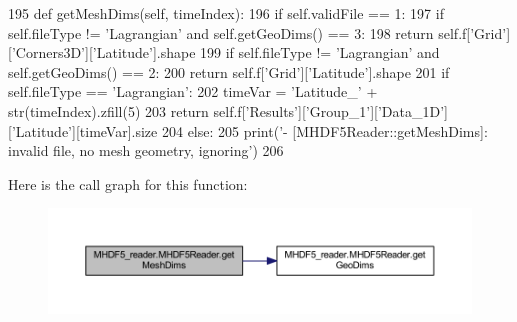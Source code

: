 \begin{DoxyCode}
195     \textcolor{keyword}{def }getMeshDims(self, timeIndex):
196         \textcolor{keywordflow}{if} self.validFile == 1:
197             \textcolor{keywordflow}{if} self.fileType != \textcolor{stringliteral}{'Lagrangian'} \textcolor{keywordflow}{and} self.getGeoDims() == 3:
198                 \textcolor{keywordflow}{return} self.f[\textcolor{stringliteral}{'Grid'}][\textcolor{stringliteral}{'Corners3D'}][\textcolor{stringliteral}{'Latitude'}].shape
199             \textcolor{keywordflow}{if} self.fileType != \textcolor{stringliteral}{'Lagrangian'} \textcolor{keywordflow}{and} self.getGeoDims() == 2:
200                 \textcolor{keywordflow}{return} self.f[\textcolor{stringliteral}{'Grid'}][\textcolor{stringliteral}{'Latitude'}].shape
201             \textcolor{keywordflow}{if} self.fileType == \textcolor{stringliteral}{'Lagrangian'}:
202                 timeVar = \textcolor{stringliteral}{'Latitude\_'} + str(timeIndex).zfill(5)
203                 \textcolor{keywordflow}{return} self.f[\textcolor{stringliteral}{'Results'}][\textcolor{stringliteral}{'Group\_1'}][\textcolor{stringliteral}{'Data\_1D'}][\textcolor{stringliteral}{'Latitude'}][timeVar].size
204         \textcolor{keywordflow}{else}:
205             print(\textcolor{stringliteral}{'- [MHDF5Reader::getMeshDims]: invalid file, no mesh geometry, ignoring'})
206             
\end{DoxyCode}
Here is the call graph for this function\+:\nopagebreak
\begin{figure}[H]
\begin{center}
\leavevmode
\includegraphics[width=350pt]{class_m_h_d_f5__reader_1_1_m_h_d_f5_reader_aa80431c3897dbff8479ebcdde1676e26_cgraph}
\end{center}
\end{figure}
\mbox{\label{class_m_h_d_f5__reader_1_1_m_h_d_f5_reader_a5ba881e026e00f66ea31d212dd0be87b}} 
